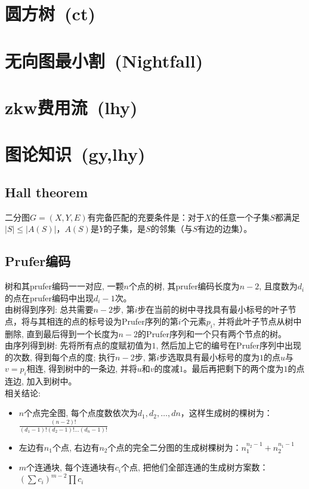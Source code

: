 \section{圆方树\ \small(ct)}
\section{无向图最小割\ \small(Nightfall)}
\section{zkw费用流\ \small(lhy)}
\section{图论知识\ \small(gy,lhy)}
    \subsection*{Hall theorem}
        二分图$ G = (X, Y, E) $有完备匹配的充要条件是：对于$ X $的任意一个子集$ S $都满足$ \left| S \right| \leq \left| A(S) \right| $，$ A(S) $是$ Y $的子集，是$ S $的邻集（与$ S $有边的边集）。
    \subsection*{Prufer编码}
        树和其prufer编码一一对应, 一颗$ n $个点的树, 其prufer编码长度为$ n − 2 $, 且度数为$ d_i $的点在prufer编码中出现$ d_i − 1 $次。
        \\由树得到序列: 总共需要$ n − 2 $步, 第$ i $步在当前的树中寻找具有最小标号的叶子节点，将与其相连的点的标号设为Prufer序列的第$ i $个元素$ p_i $, 并将此叶子节点从树中删除, 直到最后得到一个长度为$ n − 2 $的Prufer序列和一个只有两个节点的树。
        \\由序列得到树: 先将所有点的度赋初值为$ 1 $, 然后加上它的编号在Prufer序列中出现的次数, 得到每个点的度; 执行$ n − 2 $步, 第$ i $步选取具有最小标号的度为$ 1 $的点$ u $与$ v = p_i$相连, 得到树中的一条边, 并将$ u $和$ v $的度减$ 1 $。最后再把剩下的两个度为$ 1 $的点连边, 加入到树中。
        \\相关结论:
        \begin{itemize}[wide=0pt]
            \item $ n $个点完全图, 每个点度数依次为$ d_1, d_2 , \dots, dn $，这样生成树的棵树为：$ \frac{(n - 2) !}{(d_1 - 1)! (d_2 - 1)! \dots (d_n - 1)!} $
            \item 左边有$ n_1 $个点, 右边有$ n_2 $个点的完全二分图的生成树棵树为：$ n_1^{n_2 - 1} + n_2^{n_1 - 1} $
            \item $ m $个连通块, 每个连通块有$ c_i $个点, 把他们全部连通的生成树方案数：$ (\sum c_i)^{m - 2} \prod c_i $
        \end{itemize}

